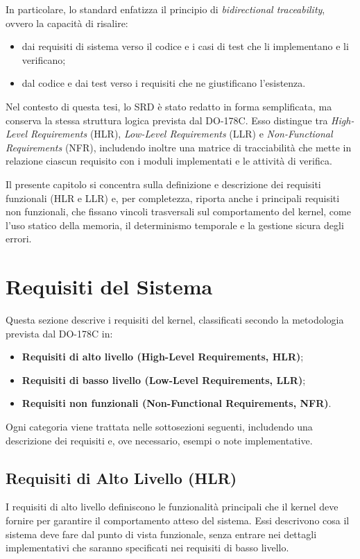 \documentclass[italian, Lau, oneside]{sapthesis} %
\begin{document}
In particolare, lo standard enfatizza il principio di \emph{bidirectional traceability}, ovvero la capacità di risalire:
\begin{itemize}
    \item dai requisiti di sistema verso il codice e i casi di test che li implementano e li verificano;
    \item dal codice e dai test verso i requisiti che ne giustificano l’esistenza.
\end{itemize}

Nel contesto di questa tesi, lo SRD è stato redatto in forma semplificata, ma conserva la stessa struttura logica prevista dal DO-178C.  
Esso distingue tra \emph{High-Level Requirements} (HLR), \emph{Low-Level Requirements} (LLR) e \emph{Non-Functional Requirements} (NFR), includendo inoltre una matrice di tracciabilità che mette in relazione ciascun requisito con i moduli implementati e le attività di verifica.  

Il presente capitolo si concentra sulla definizione e descrizione dei requisiti funzionali (HLR e LLR) e, per completezza, riporta anche i principali requisiti non funzionali, che fissano vincoli trasversali sul comportamento del kernel, come l’uso statico della memoria, il determinismo temporale e la gestione sicura degli errori.

\section{Requisiti del Sistema}

Questa sezione descrive i requisiti del kernel, classificati secondo la metodologia prevista dal DO-178C in:
\begin{itemize}
    \item \textbf{Requisiti di alto livello (High-Level Requirements, HLR)};
    \item \textbf{Requisiti di basso livello (Low-Level Requirements, LLR)};
    \item \textbf{Requisiti non funzionali (Non-Functional Requirements, NFR)}.
\end{itemize}

Ogni categoria viene trattata nelle sottosezioni seguenti, includendo una descrizione dei requisiti e, ove necessario, esempi o note implementative.

\subsection{Requisiti di Alto Livello (HLR)}
I requisiti di alto livello definiscono le funzionalità principali che il kernel deve fornire per garantire il comportamento atteso del sistema.  
Essi descrivono cosa il sistema deve fare dal punto di vista funzionale, senza entrare nei dettagli implementativi che saranno specificati nei requisiti di basso livello.
\end{document}
